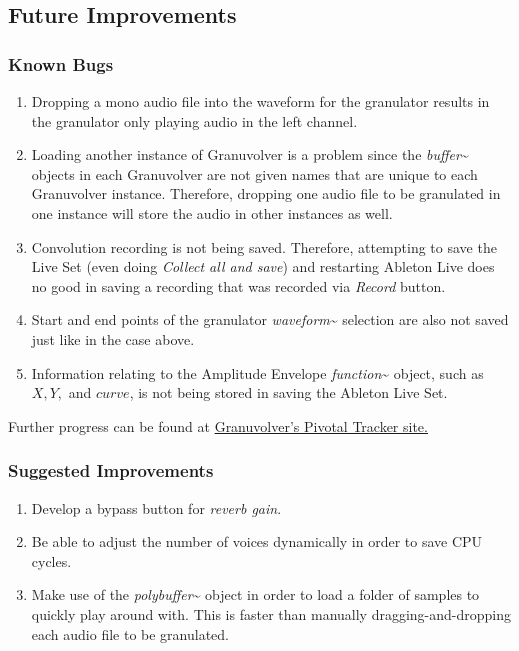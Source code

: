 \documentclass{article}
\begin{document}
		


		\subsection{Future Improvements}
			\subsubsection{Known Bugs}
				\begin{enumerate}
					\item Dropping a mono audio file into the waveform for the granulator results in the granulator only playing audio in the left channel.

					\item Loading another instance of Granuvolver is a problem since the \emph{buffer}\~{} objects in each Granuvolver are not given names that are unique to each Granuvolver instance.  Therefore, dropping one audio file to be granulated in one instance will store the audio in other instances as well.

					\item Convolution recording is not being saved.  Therefore, attempting to save the Live Set (even doing \emph{Collect all and save}) and restarting Ableton Live does no good in saving a recording that was recorded via \emph{Record} button.

					\item Start and end points of the granulator \emph{waveform}\~{} selection are also not saved just like in the case above.

					\item Information relating to the Amplitude Envelope \emph{function}\~{} object, such as $X,Y,$ and $curve$, is not being stored in saving the Ableton Live Set. 

				\end{enumerate}

				Further progress can be found at \href{https://www.pivotaltracker.com/s/projects/961764}{Granuvolver's Pivotal Tracker site.}

			\subsubsection{Suggested Improvements}
				\begin{enumerate}
					\item Develop a bypass button for \emph{reverb gain}.
					
					\item Be able to adjust the number of voices dynamically in order to save CPU cycles.
					
					\item Make use of the \emph{polybuffer}\~{} object in order to load a folder of samples to quickly play around with.  This is faster than manually dragging-and-dropping each audio file to be granulated.


				\end{enumerate}
\end{document}
